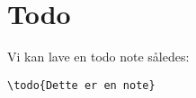 \documentclass[class=report, crop=false]{standalone}
\begin{document}
    \section{Todo}
    Vi kan lave en todo note således:
    \begin{tcolorbox}
        \verb|\todo{Dette er en note}|
    \end{tcolorbox}
\end{document}
